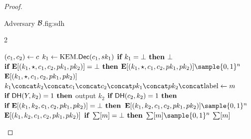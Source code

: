 \documentclass{article}
\begin{document}
\begin{proof}
\begin{itemize}
\begin{gamefigure}{Adversary $\mathcal{B}$.}{fig:sdh}
\begin{games}{2}
\begin{gameenv}{\oracledec}
                                                                \State $(c_1, c_2) \leftarrow c$
                                                                \State $k_1 \leftarrow \text{KEM}.\textsf{Dec}(c_1, sk_1)$
                                                                \State $\textbf{if } k_1 = \bot \textbf{ then}$
                                                                    \State \quad \Return $\bot$
                                                                    \State $\textbf{if } \mathbf{E}[(k_1, \star, c_1, c_2, pk_1, pk_2)] = \bot \textbf{ then}$
                                                                        \State \quad $\pset{E}[(k_1, \marker, c_1, c_2, \pk_1, \pk_2)] \sample \bits^{n}$
                                                                        \State \Return $\mathbf{E}[(k_1, \star, c_1, c_2, pk_1, pk_2)]$
                                                                        \Statex
                                                                        \State \underline{}
                                                                        \State $\hashinput \gets m$
                                                                            \State $\textbf{if } \textsf{DH}(Y, k_2) = 1 \textbf{ then}$ \label{line:found_cdh}
                                                                                \State \qquad output $k_2$
                                                                                \State $\textbf{if } \textsf{DH}(c_2, k_2) = 1 \textbf{ then}$ \label{line:is_valid_query}
                                                                                \State \qquad $\textbf{if } \mathbf{E}[(k_1, k_2, c_1, c_2, pk_1, pk_2)] = \bot \textbf{ then}$
                                                                                    \State \qquad \quad $\pset{E}[(k_1, k_2, c_1, c_2, \pk_1, \pk_2)] \sample \bits^{n}$
                                                                                    \State \qquad \Return $\mathbf{E}[(k_1, k_2, c_1, c_2, pk_1, pk_2)]$
                                                                                    \State $\textbf{if } \sum[m] = \bot \textbf{ then}$
                                                                                    \State \quad $\ROMtable[m] \sample \bits^{n}$
                                                                                    \State \Return $\sum[m]$
                                                                                        \end{gameenv}
                                                                                    \end{games}
                                                                                \end{gamefigure}


\end{itemize}
\end{proof}
\end{document}

